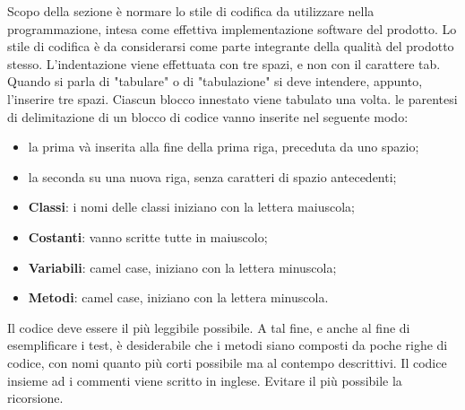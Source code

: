 	    Scopo della sezione è normare lo stile di codifica da utilizzare nella programmazione, intesa come effettiva implementazione software del prodotto. Lo stile di codifica è da considerarsi come parte integrante della qualità del prodotto stesso.
	    L'indentazione viene effettuata con tre spazi, e non con il carattere tab. Quando si parla di "tabulare" o di "tabulazione" si deve intendere, appunto, l'inserire tre spazi.
	    Ciascun blocco innestato viene tabulato una volta.
	    le parentesi di delimitazione di un blocco di codice vanno inserite nel seguente modo:
	    \begin{itemize}
	        \item la prima và inserita alla fine della prima riga, preceduta da uno spazio;
	        \item la seconda su una nuova riga, senza caratteri di spazio antecedenti;
	    \end{itemize}
	    
	    \begin{itemize}
	        \item \textbf{Classi}: i nomi delle classi iniziano con la lettera maiuscola;
	        \item \textbf{Costanti}: vanno scritte tutte in maiuscolo;
	        \item \textbf{Variabili}: camel case, iniziano con la lettera minuscola;
	        \item \textbf{Metodi}: camel case, iniziano con la lettera minuscola.
	    \end{itemize}
	    Il codice deve essere il più leggibile possibile. A tal fine, e anche al fine di esemplificare i test, è desiderabile che i metodi siano composti da poche righe di codice, con nomi quanto più corti possibile ma al contempo descrittivi.
	    Il codice insieme ad i commenti viene scritto in inglese.
	    Evitare il più possibile la ricorsione.
